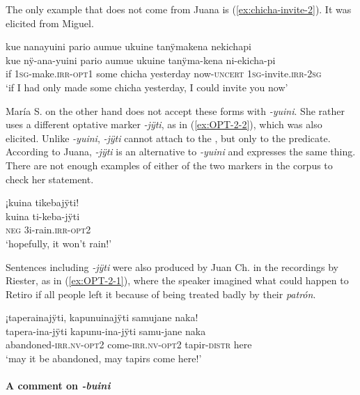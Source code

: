 The only example that does not come from Juana is (\ref{ex:chicha-invite-2}). It was elicited from Miguel.

\ea\label{ex:chicha-invite-2}
\begingl
\glpreamble kue nanayuini pario aumue ukuine tanÿmakena nekichapi \\
\gla kue nÿ-ana-yuini pario aumue ukuine tanÿma-kena ni-ekicha-pi \\
\glb if 1\textsc{sg}-make.\textsc{irr}-\textsc{opt}1 some chicha yesterday now-\textsc{uncert} 1\textsc{sg}-invite.\textsc{irr}-2\textsc{sg}\\
\glft ‘if I had only made some chicha yesterday, I could invite you now’
\endgl
\trailingcitation{[mxx-e160811sd.438]}
\xe

María S. on the other hand does not accept these forms with \textit{-yuini}. She rather uses a different optative marker \textit{-jÿti}, as in (\ref{ex:OPT-2-2}), which was also elicited. Unlike \textit{-yuini}, \textit{-jÿti} cannot attach to the , but only to the predicate. According to Juana, \textit{-jÿti} is an alternative to \textit{-yuini} and expresses the same thing. There are not enough examples of either of the two markers in the corpus to check her statement.

\ea\label{ex:OPT-2-2}
\begingl
\glpreamble ¡kuina tikebajÿti!\\
\gla kuina ti-keba-jÿti\\
\glb \textsc{neg} 3i-rain.\textsc{irr}-\textsc{opt}2\\
\glft ‘hopefully, it won’t rain!’
\endgl
\trailingcitation{[jxx-e181101l-1]}
\xe

Sentences including \textit{-jÿti} were also produced by Juan Ch. in the recordings by Riester, as in (\ref{ex:OPT-2-1}), where the speaker imagined what could happen to Retiro if all people left it because of being treated badly by their \textit{patrón}.

\ea\label{ex:OPT-2-1}
\begingl
\glpreamble ¡taperainajÿti, kapunuinajÿti samujane naka!\\
\gla tapera-ina-jÿti kapunu-ina-jÿti samu-jane naka\\
\glb abandoned-\textsc{irr.nv}-\textsc{opt}2 come-\textsc{irr.nv}-\textsc{opt}2 tapir-\textsc{distr} here\\
\glft ‘may it be abandoned, may tapirs come here!’
\endgl
\trailingcitation{[nxx-p630101g-1.113-114]}
\xe
{}

\paragraph{A comment on \textit{-buini}}\label{sec:buini}


